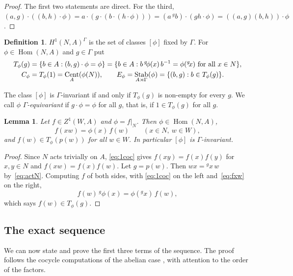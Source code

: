 \documentclass[12pt,letterpaper]{article}
\numberwithin{equation}{section}
\theoremstyle{plain}
\newtheorem{lemma}[theorem]{Lemma}
\theoremstyle{definition}
\newtheorem{definition}[theorem]{Definition}
\newcommand{\act}[2]{{}^{#1}\!#2}          %
\DeclareMathOperator{\Hom}{Hom}
\DeclareMathOperator{\Cent}{Cent}
\DeclareMathOperator{\Stab}{Stab}
\begin{document}
\begin{proof}
The first two statements are direct. For the third,
$(a,g)\cdot((b,h)\cdot\phi)=a\cdot(g\cdot(b\cdot(h\cdot\phi)))
=(a\,\act{g}{b})\cdot(gh\cdot\phi)=((a,g)(b,h))\cdot\phi$.
\end{proof}

\begin{definition}\label{def:T}
$H^1(N,A)^\Gamma$ is the set of classes $[\phi]$ fixed by $\Gamma$. For
$\phi\in\Hom(N,A)$ and $g\in\Gamma$ put
\begin{align}
T_\phi(g)&=\{b\in A:(b,g)\cdot\phi=\phi\}
=\{b\in A: b\,\act{g}{\phi(x)}\,b^{-1}=\phi(\act{g}{x})
\text{ for all } x\in N\}, \label{eq:T}\\
C_\phi&=T_\phi(1)=\Cent_A(\phi(N)),\qquad
E_\phi=\Stab_{A\rtimes\Gamma}(\phi)=\{(b,g): b\in T_\phi(g)\}. \notag
\end{align}
\end{definition}

The class $[\phi]$ is $\Gamma$-invariant if and only if $T_\phi(g)$ is
non-empty for every $g$. We call $\phi$ \emph{$\Gamma$-equivariant} if
$g\cdot\phi=\phi$ for all $g$, that is, if $1\in T_\phi(g)$ for all $g$.

\begin{lemma}\label{lem:restrict}
Let $f\in Z^1(W,A)$ and $\phi=f|_N$. Then $\phi\in\Hom(N,A)$,
\begin{equation}\label{eq:fxw}
f(xw)=\phi(x)\,f(w)\qquad(x\in N,\ w\in W),
\end{equation}
and $f(w)\in T_\phi(p(w))$ for all $w\in W$. In particular $[\phi]$ is
$\Gamma$-invariant.
\end{lemma}

\begin{proof}
Since $N$ acts trivially on $A$, \eqref{eq:1coc} gives
$f(xy)=f(x)f(y)$ for $x,y\in N$ and $f(xw)=f(x)f(w)$. Let $g=p(w)$. Then
$wx=\act{g}{x}\,w$ by~\eqref{eq:actN}. Computing $f$ of both sides, with
\eqref{eq:1coc} on the left and~\eqref{eq:fxw} on the right,
\[
f(w)\,\act{g}{\phi(x)}=\phi(\act{g}{x})\,f(w),
\]
which says $f(w)\in T_\phi(g)$.
\end{proof}

\subsection{The exact sequence}

We can now state and prove the first three terms of the sequence. The
proof follows the cocycle computations of the abelian case
\cite[Ch.~VII, \S6]{Se79}, with attention to the order of the factors.
\end{document}
